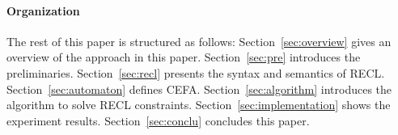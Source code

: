 
\paragraph*{Organization} The rest of this paper is structured as follows: Section~\ref{sec:overview} gives an overview of the approach in this paper. Section~\ref{sec:pre} introduces the preliminaries. 
Section~\ref{sec:recl} presents the syntax and semantics of RECL. 
Section~\ref{sec:automaton} defines CEFA. Section~\ref{sec:algorithm} introduces the algorithm to solve RECL constraints. Section~\ref{sec:implementation} shows the experiment results. Section~\ref{sec:conclu} concludes this paper.


